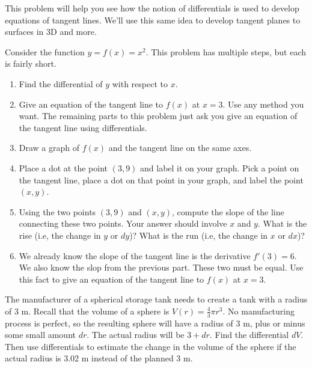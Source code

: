 This problem will help you see how the notion of differentials is used to develop equations of tangent lines. We'll use this same idea to develop tangent planes to surfaces in 3D and more.
\begin{problem} \label{differentials give tangent
    lines}
Consider the function $y=f(x) = x^2$. This problem has multiple steps, but each is fairly short.
\begin{enumerate}
\item Find the differential of $y$ with respect to $x$.  
\item Give an equation of the tangent line to $f(x)$ at $x=3$. Use any method you want.  The remaining parts to this problem just ask you give an equation of the tangent line using differentials.
\item Draw a graph of $f(x)$ and the tangent line on the same axes.
\item Place a dot at the point $(3,9)$ and label it on your graph. Pick a point on the tangent line, place a dot on that point in your graph, and label the point $(x,y)$. 
\item Using the two points $(3,9)$ and $(x,y)$, compute the slope of the line connecting these two points. Your answer should involve $x$ and $y$. What is the rise (i.e, the change in $y$ or $dy$)? What is the run (i.e, the change in $x$ or $dx$)?  
\item We already know the slope of the tangent line is the derivative $f'(3)=6$. We also know the slop from the previous part. These two must be equal. Use this fact to give an equation of the tangent line to $f(x)$ at $x=3$. 
\end{enumerate}
\end{problem}
 
\begin{problem}  \label{diff-sphere}
The manufacturer of a spherical storage tank needs to create a tank with a radius of 3 m. Recall that the volume of a sphere is $V(r) = \frac{4}{3}\pi r^3$. No manufacturing process is perfect, so the resulting sphere will have a radius of 3 m, plus or minus some small amount $dr$. The actual radius will be $3+dr$. Find the differential $dV$.  Then use differentials to estimate the change in the volume of the sphere if the actual radius is 3.02 m instead of the planned 3 m.    
\end{problem}
 
